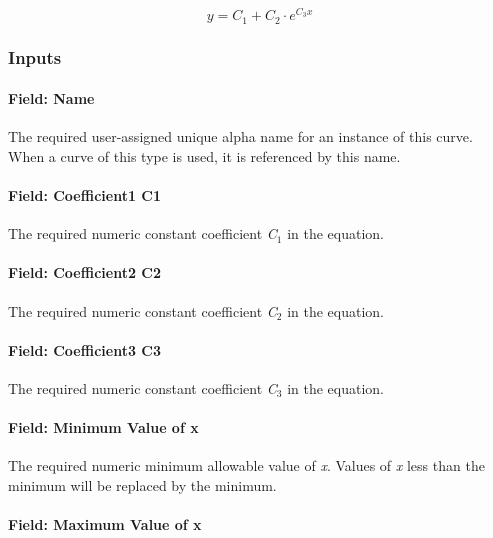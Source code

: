 \begin{equation}
  y = C_1 + C_2 \cdot e^{C_3 x}
\end{equation}

\subsubsection{Inputs}\label{inputs-17-005}

\paragraph{Field: Name}\label{field-name-17-004}

The required user-assigned unique alpha name for an instance of this curve. When a curve of this type is used, it is referenced by this name.

\paragraph{Field: Coefficient1 C1}\label{field-coefficient1-c1-4}

The required numeric constant coefficient \emph{C\(_{1}\)} in the equation.

\paragraph{Field: Coefficient2 C2}\label{field-coefficient2-c2-4}

The required numeric constant coefficient \emph{C\(_{2}\)} in the equation.

\paragraph{Field: Coefficient3 C3}\label{field-coefficient3-c3-4}

The required numeric constant coefficient \emph{C\(_{3}\)} in the equation.

\paragraph{Field: Minimum Value of x}\label{field-minimum-value-of-x-16}

The required numeric minimum allowable value of \emph{x}. Values of \emph{x} less than the minimum will be replaced by the minimum.

\paragraph{Field: Maximum Value of x}\label{field-maximum-value-of-x-17}

